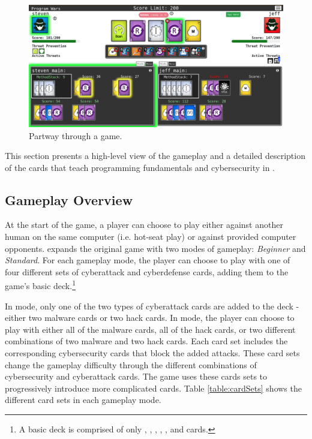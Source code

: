 \section{\pwTwo}

\begin{figure}[ht]
	\centering
	\includegraphics[width=\textwidth]{images/game.PNG}
	\caption{Partway through a game.}
	\label{fig:game}
\end{figure}

This section presents a high-level view of the gameplay and a detailed description of the cards that teach programming fundamentals and cybersecurity in \pwTwoNS. 

\subsection{Gameplay Overview}
At the start of the game, a player can choose to play either against another human on the same computer (i.e. hot-seat play) or against provided computer opponents. \pwTwo expands the original game with two modes of gameplay: \emph{Beginner} and \emph{Standard}. For each gameplay mode, the player can choose to play with one of four different sets of cyberattack and cyberdefense cards, adding them to the game's basic deck.\footnote{A basic \gameName deck is comprised of only \Ins, \Mns, \Rns, \Vns, \Serns, \Sort and \Scan cards.}

In \B mode, only one of the two types of cyberattack cards are added to the deck - either two malware cards or two hack cards. In \Std mode, the player can choose to play with either all of the malware cards, all of the hack cards, or two different combinations of two malware and two hack cards. Each card set includes the corresponding cybersecurity cards that block the added attacks. These card sets change the gameplay difficulty through the different combinations of cybersecurity and cyberattack cards. The game uses these cards sets to progressively introduce more complicated cards. Table \ref{table:cardSets} shows the different card sets in each gameplay mode. 

